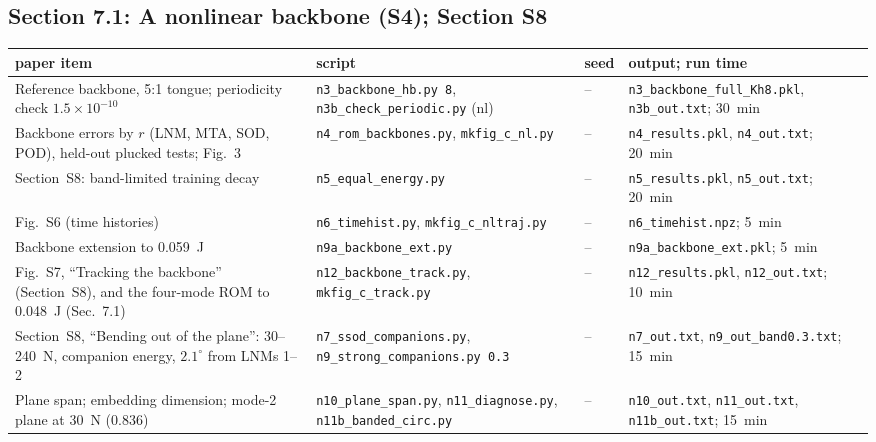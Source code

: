 \documentclass[10pt]{article}
\newcommand{\f}[1]{\texttt{#1}}
\begin{document}
\subsection*{Section 7.1: A nonlinear backbone (S4); Section S8}
\begin{longtable}{L{0.31\textwidth}L{0.25\textwidth}L{0.08\textwidth}L{0.25\textwidth}}
\toprule
paper item & script & seed & output; run time\\ \midrule
Reference backbone, 5:1 tongue; periodicity check $1.5\times10^{-10}$ & \f{n3\_\allowbreak{}backbone\_\allowbreak{}hb.py 8}, \f{n3b\_\allowbreak{}check\_\allowbreak{}periodic.py} (nl) & -- & \f{n3\_\allowbreak{}backbone\_\allowbreak{}full\_\allowbreak{}Kh8.pkl}, \f{n3b\_\allowbreak{}out.txt}; 30~min\\
Backbone errors by $r$ (LNM, MTA, SOD, POD), held-out plucked tests; Fig.~3 & \f{n4\_\allowbreak{}rom\_\allowbreak{}backbones.py}, \f{mkfig\_\allowbreak{}c\_\allowbreak{}nl.py} & -- & \f{n4\_\allowbreak{}results.pkl}, \f{n4\_\allowbreak{}out.txt}; 20~min\\
Section~S8: band-limited training decay & \f{n5\_\allowbreak{}equal\_\allowbreak{}energy.py} & -- & \f{n5\_\allowbreak{}results.pkl}, \f{n5\_\allowbreak{}out.txt}; 20~min\\
Fig.~S6 (time histories) & \f{n6\_\allowbreak{}timehist.py}, \f{mkfig\_\allowbreak{}c\_\allowbreak{}nltraj.py} & -- & \f{n6\_\allowbreak{}timehist.npz}; 5~min\\
Backbone extension to 0.059~J & \f{n9a\_\allowbreak{}backbone\_\allowbreak{}ext.py} & -- & \f{n9a\_\allowbreak{}backbone\_\allowbreak{}ext.pkl}; 5~min\\
Fig.~S7, ``Tracking the backbone'' (Section~S8), and the four-mode ROM to 0.048~J (Sec.~7.1) & \f{n12\_\allowbreak{}backbone\_\allowbreak{}track.py}, \f{mkfig\_\allowbreak{}c\_\allowbreak{}track.py} & -- & \f{n12\_\allowbreak{}results.pkl}, \f{n12\_\allowbreak{}out.txt}; 10~min\\
Section~S8, ``Bending out of the plane'': 30--240~N, companion energy, $2.1^\circ$ from LNMs 1--2 & \f{n7\_\allowbreak{}ssod\_\allowbreak{}companions.py}, \f{n9\_\allowbreak{}strong\_\allowbreak{}companions.py 0.3} & -- & \f{n7\_\allowbreak{}out.txt}, \f{n9\_\allowbreak{}out\_\allowbreak{}band0.3.txt}; 15~min\\
Plane span; embedding dimension; mode-2 plane at 30~N (0.836) & \f{n10\_\allowbreak{}plane\_\allowbreak{}span.py}, \f{n11\_\allowbreak{}diagnose.py}, \f{n11b\_\allowbreak{}banded\_\allowbreak{}circ.py} & -- & \f{n10\_\allowbreak{}out.txt}, \f{n11\_\allowbreak{}out.txt}, \f{n11b\_\allowbreak{}out.txt}; 15~min\\

\end{longtable}
\end{document}
